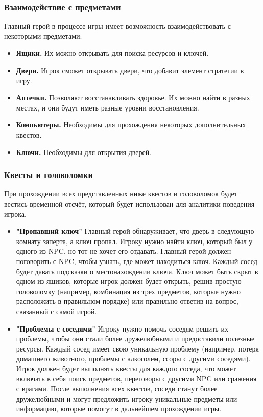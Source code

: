 \documentclass[12pt]{article}
\begin{document}
\subsubsection{Взаимодействие с предметами}
Главный герой в процессе игры имеет возможность взаимодействовать с некоторыми предметами:

\begin{itemize}[label=--]
    \item \textbf{Ящики.} Их можно открывать для поиска ресурсов и ключей.
    \item \textbf{Двери.} Игрок сможет открывать двери, что добавит элемент стратегии в игру.
    \item \textbf{Аптечки.} Позволяют восстанавливать здоровье. Их можно найти в разных местах, и они будут иметь разные уровни восстановления.
    \item \textbf{Компьютеры.} Необходимы для прохождения некоторых дополнительных квестов.
    \item \textbf{Ключи.} Необходимы для открытия дверей.
\end{itemize}

\subsubsection{Квесты и головоломки}
При прохождении всех представленных ниже квестов и головоломок будет вестись временной отсчёт, который будет использован для аналитики поведения игрока.

\begin{itemize}[label=--]
    \item \textbf{"Пропавший ключ"} Главный герой обнаруживает, что дверь в следующую комнату заперта, а ключ пропал. Игроку нужно найти ключ, который был у одного из NPC, но тот не хочет его отдавать. Главный герой должен поговорить с NPC, чтобы узнать, где может находиться ключ. Каждый сосед будет давать подсказки о местонахождении ключа. Ключ может быть скрыт в одном из ящиков, которые игрок должен будет открыть, решив простую головоломку (например, комбинация из трех предметов, которые нужно расположить в правильном порядке) или правильно ответив на вопрос, связанный с самой игрой.
    \item \textbf{"Проблемы с соседями"} Игроку нужно помочь соседям решить их проблемы, чтобы они стали более дружелюбными и предоставили полезные ресурсы.
    Каждый сосед имеет свою уникальную проблему (например, потеря домашнего животного, проблемы с алкоголем, ссоры с другими соседями). Игрок должен будет выполнять квесты для каждого соседа, что может включать в себя поиск предметов, переговоры с другими NPC или сражения с врагами. После выполнения всех квестов, соседи станут более дружелюбными и могут предложить игроку уникальные предметы или информацию, которые помогут в дальнейшем прохождении игры.
\end{itemize}
\end{document}
